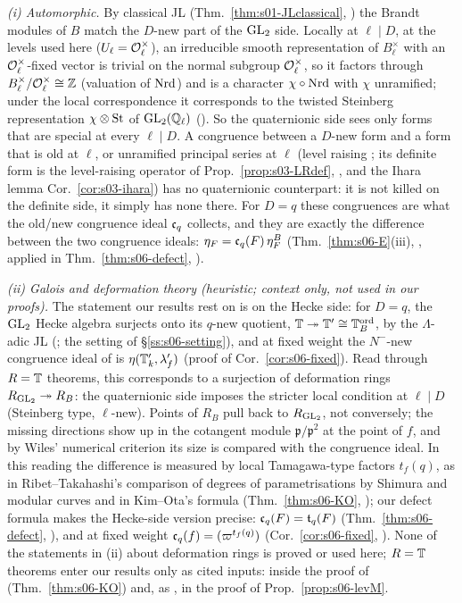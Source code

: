\emph{(i) Automorphic.} By classical JL (Thm.~\ref{thm:s01-JLclassical}, \stcited) the Brandt modules of $B$ match the $D$-new
part of the $\mathrm{GL}_2$ side. Locally at $\ell\mid D$, at the levels used here ($U_\ell=\mathcal{O}_\ell^\times$), an irreducible smooth representation of $B_\ell^\times$
with an $\mathcal{O}_\ell^\times$-fixed vector is trivial on the normal subgroup $\mathcal{O}_\ell^\times$, so it factors through
$B_\ell^\times/\mathcal{O}_\ell^\times\cong\mathbb{Z}$ (valuation of $\mathrm{Nrd}$) and is a character $\chi\circ\mathrm{Nrd}$ with $\chi$ unramified; under the
local correspondence it corresponds to the twisted Steinberg representation $\chi\otimes\mathrm{St}$ of $\mathrm{GL}_2(\mathbb{Q}_\ell)$
\cite[Ch.~III, Thm.~15.1 and the paragraph after Lemma~15.4]{JL} (\stcited). So the quaternionic side sees only forms that are special at every $\ell\mid D$. A
congruence between a $D$-new form and a form that is old at $\ell$, or unramified principal series at $\ell$ (level raising
\cite{Ri84}; its definite form is the level-raising operator of Prop.~\ref{prop:s03-LRdef}, \stproved, and the Ihara lemma
Cor.~\ref{cor:s03-ihara}) has no quaternionic counterpart: it is not killed on the definite side, it simply has none there.
For $D=q$ these congruences are what the old/new congruence ideal $\mathfrak{c}_q$ collects, and they are exactly the difference
between the two congruence ideals: $\eta_F=\mathfrak{c}_q(F)\,\eta^B_F$ (Thm.~\ref{thm:s06-E}(iii), \stproved, applied in
Thm.~\ref{thm:s06-defect}, \stpmc).

\emph{(ii) Galois and deformation theory (heuristic; context only, not used in our proofs).} The statement our results rest on is
on the Hecke side: for $D=q$, the $\mathrm{GL}_2$ Hecke algebra surjects onto its $q$-new quotient, $\mathbb{T}\twoheadrightarrow\mathbb{T}'\cong\mathbb{T}^{\mathrm{ord}}_B$, by the
$\Lambda$-adic JL \cite[Rem.~7.8]{Hs} (\stcited; the setting of \S\ref{ss:s06-setting}), and at fixed weight the $N^-$-new
congruence ideal of \cite[Def.~2.11]{KO} is $\eta(\mathbb{T}'_k,\lambda'_f)$ (proof of Cor.~\ref{cor:s06-fixed}). Read through
$R=\mathbb{T}$ theorems, this corresponds to a surjection of deformation rings $R_{\mathrm{GL}_2}\twoheadrightarrow R_B$: the quaternionic side
imposes the stricter local condition at $\ell\mid D$ (Steinberg type, $\ell$-new). Points of $R_B$ pull back to $R_{\mathrm{GL}_2}$, not
conversely; the missing directions show up in the cotangent module $\mathfrak p/\mathfrak p^2$ at the point of $f$, and by Wiles'
numerical criterion \cite[Appendix]{Wi95} its size is compared with the congruence ideal. In this reading the difference is
measured by local Tamagawa-type factors $t_f(q)$, as in Ribet--Takahashi's comparison of degrees of parametrisations by Shimura
and modular curves \cite[Thm.~1]{RT97} and in Kim--Ota's formula \cite[Thm.~1.1]{KO} (Thm.~\ref{thm:s06-KO}, \stcited); our
defect formula makes the Hecke-side version precise: $\mathfrak{c}_q(F)=\mathfrak{t}_q(F)$ (Thm.~\ref{thm:s06-defect}, \stpmc), and at fixed
weight $\mathfrak{c}_q(f)=(\varpi^{t_f(q)})$ (Cor.~\ref{cor:s06-fixed}, \stpmc). None of the statements in (ii) about deformation rings
is proved or used here; $R=\mathbb{T}$ theorems enter our results only as cited inputs: inside the proof of
\cite[Thm.~1.1]{KO} (Thm.~\ref{thm:s06-KO}) and, as \cite[Thm.~3.14]{KO}, in the proof of Prop.~\ref{prop:s06-levM}.

